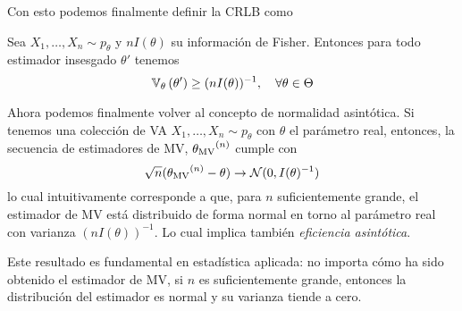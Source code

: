 Con esto podemos finalmente definir la CRLB como 

\begin{definition}
	Sea $X_1,\ldots,X_n \sim p_\theta$ y $nI(\theta)$ su información de Fisher. Entonces para todo estimador insesgado $\theta'$ tenemos 
	\begin{equation}
		\mathbb{V}_\theta \left(\theta'\right)\geq (nI(\theta))^{-1},\quad \forall \theta\in\Theta
	\end{equation}
\end{definition}

Ahora podemos finalmente volver al concepto de normalidad asintótica. Si tenemos una colección de VA $X_1,\ldots,X_n\sim p_\theta$ con $\theta$ el parámetro real, entonces, la secuencia de estimadores de MV, ${\theta_\text{MV}}^{(n)}$ cumple con 
\begin{equation}
	\sqrt{n}({\theta_\text{MV}}^{(n)}-\theta)\rightarrow {\mathcal N}(0,I(\theta)^{-1})
\end{equation}
lo cual intuitivamente corresponde a que, para $n$ suficientemente grande, el estimador de MV está distribuido de forma normal en torno al parámetro real con varianza $(nI(\theta))^{-1}$. Lo cual implica también \textit{eficiencia asintótica}.

Este resultado es fundamental en estadística aplicada: no importa cómo ha sido obtenido el estimador de MV, si $n$ es suficientemente grande, entonces la distribución del estimador es normal y su varianza tiende a cero. 



